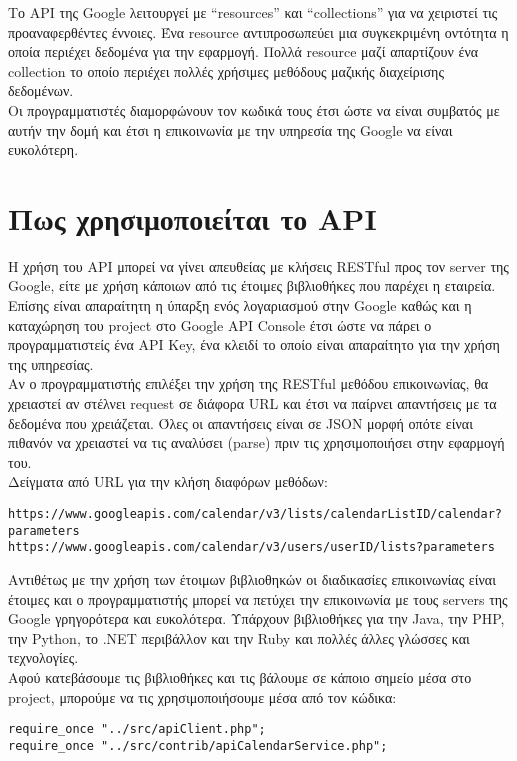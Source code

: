 \documentclass[12pt]{article}
\begin{document}
Το API της Google λειτουργεί με “resources” και “collections” για να χειριστεί τις προαναφερθέντες έννοιες. Ένα resource αντιπροσωπεύει μια συγκεκριμένη οντότητα η οποία περιέχει δεδομένα για την εφαρμογή. Πολλά resource μαζί απαρτίζουν ένα collection το οποίο περιέχει πολλές χρήσιμες μεθόδους μαζικής διαχείρισης δεδομένων.
\\[0.3cm]
Οι προγραμματιστές διαμορφώνουν τον κωδικά τους έτσι ώστε να είναι συμβατός με αυτήν την δομή και έτσι η επικοινωνία με την υπηρεσία της Google να είναι ευκολότερη. 

\section {Πως χρησιμοποιείται το API}
Η χρήση του API μπορεί να γίνει απευθείας με κλήσεις RESTful προς τον server της Google, είτε με χρήση κάποιων από τις έτοιμες βιβλιοθήκες που παρέχει η εταιρεία. Επίσης είναι απαραίτητη η ύπαρξη ενός λογαριασμού στην Google καθώς και η καταχώρηση του project στο Google API Console έτσι ώστε να πάρει ο προγραμματιστείς ένα API Key, ένα κλειδί το οποίο είναι απαραίτητο για την χρήση της υπηρεσίας. 
\\[0.3cm]
Αν ο προγραμματιστής επιλέξει την χρήση της RESTful μεθόδου επικοινωνίας, θα χρειαστεί αν στέλνει request σε διάφορα URL και έτσι να παίρνει απαντήσεις με τα δεδομένα που χρειάζεται. Όλες οι απαντήσεις είναι σε JSON μορφή οπότε είναι πιθανόν να χρειαστεί να τις αναλύσει (parse) πριν τις χρησιμοποιήσει στην εφαρμογή του. 
\\[0.3cm]
Δείγματα από URL για την κλήση διαφόρων μεθόδων: 

\begin{verbatim}
https://www.googleapis.com/calendar/v3/lists/calendarListID/calendar?parameters
https://www.googleapis.com/calendar/v3/users/userID/lists?parameters
\end{verbatim}

Αντιθέτως με την χρήση των έτοιμων βιβλιοθηκών οι διαδικασίες επικοινωνίας είναι έτοιμες και ο προγραμματιστής μπορεί να πετύχει την επικοινωνία με τους servers της Google γρηγορότερα και ευκολότερα. Υπάρχουν βιβλιοθήκες για την Java, την PHP, την Python, το .NET περιβάλλον και την Ruby και πολλές άλλες γλώσσες και τεχνολογίες. 
\\[0.3cm]
Αφού κατεβάσουμε τις βιβλιοθήκες και τις βάλουμε σε κάποιο σημείο μέσα στο project, μπορούμε να τις χρησιμοποιήσουμε μέσα από τον κώδικα:

\begin{verbatim}
require_once "../src/apiClient.php";
require_once "../src/contrib/apiCalendarService.php";
\end{verbatim}
\end{document}
